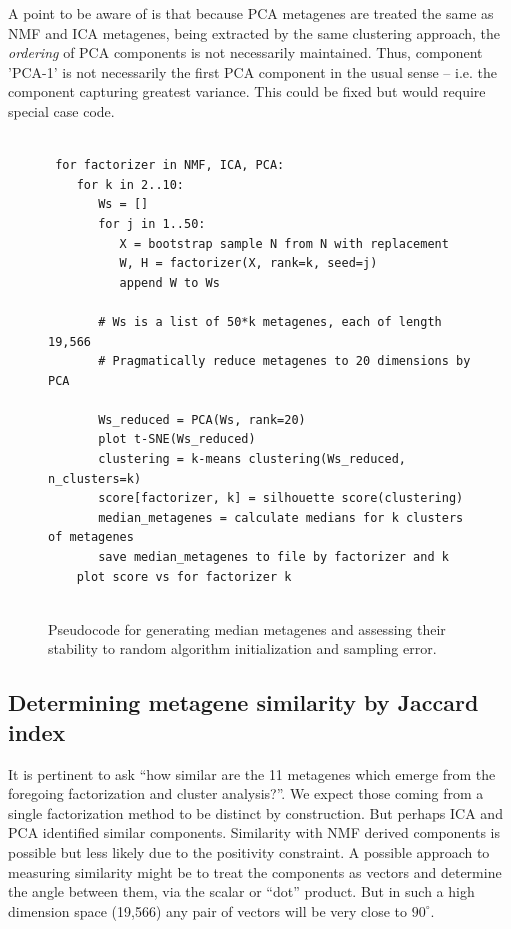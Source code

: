\documentclass[tikz, 12pt,a4paper,oneside,fleqn]{article}
\begin{document}
A point to be aware of is that because PCA metagenes are treated the same as NMF and ICA metagenes, being extracted by the same clustering approach, the \emph{ordering} of PCA components is not necessarily maintained.   Thus, component 'PCA-1' is not necessarily the first PCA component  in the usual sense -- i.e. the component capturing greatest variance.  This could be fixed but would require special case code.

\begin{figure}[htb!]
\begin{center}
\begin{Verbatim}[baselinestretch=1, frame=single, rulecolor=\color{blue}, label=Metagene Stability Assessment, fontfamily=courier, fontsize=\small]

 for factorizer in NMF, ICA, PCA:
    for k in 2..10:
       Ws = []
       for j in 1..50:
          X = bootstrap sample N from N with replacement
          W, H = factorizer(X, rank=k, seed=j)
          append W to Ws
   	     
       # Ws is a list of 50*k metagenes, each of length 19,566
       # Pragmatically reduce metagenes to 20 dimensions by PCA
   	  
       Ws_reduced = PCA(Ws, rank=20)
       plot t-SNE(Ws_reduced)
       clustering = k-means clustering(Ws_reduced, n_clusters=k)
       score[factorizer, k] = silhouette score(clustering)	  
       median_metagenes = calculate medians for k clusters of metagenes
       save median_metagenes to file by factorizer and k
    plot score vs for factorizer k
      
\end{Verbatim}
\end{center}
\caption{Pseudocode for generating median metagenes and assessing their stability to random algorithm initialization and sampling error.}
\label{fig-clustering-psuedocode}
\end{figure}

\subsection{Determining metagene similarity by Jaccard index}

It is pertinent to ask ``how similar are the 11 metagenes which emerge from the foregoing factorization and cluster analysis?''.  We expect those coming from a single factorization method to be distinct by construction.  But perhaps ICA and PCA identified similar components.  Similarity with NMF derived components is possible but less likely due to the positivity constraint.  A possible approach to measuring similarity might be to treat the components as vectors and determine the angle between them, via the scalar or ``dot'' product.  But in such a high dimension space (19,566) any pair of vectors will be very close to $90^\circ$.
\end{document}
